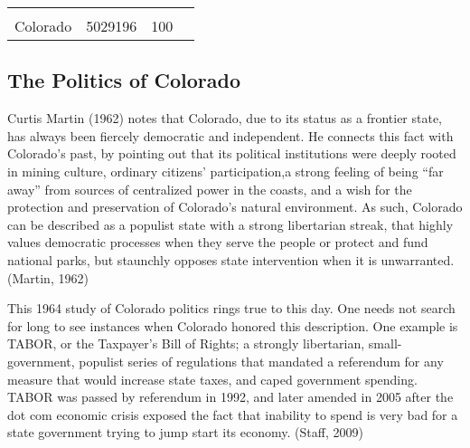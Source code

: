 \documentclass[12pt,twoside]{reedthesis}
\begin{document}
\begin{longtable}[]{@{}lccl@{}}
\begin{minipage}[t]{0.34\columnwidth}
  \strut
  \end{minipage}\tabularnewline
  \begin{minipage}[t]{0.13\columnwidth}\raggedright\strut
  Colorado\strut
  \end{minipage} & \begin{minipage}[t]{0.21\columnwidth}\centering\strut
  5029196\strut
  \end{minipage} & \begin{minipage}[t]{0.20\columnwidth}\centering\strut
  100\strut
  \end{minipage} & \begin{minipage}[t]{0.34\columnwidth}\raggedright\strut
  \strut
  \end{minipage}\tabularnewline
  \bottomrule
  \end{longtable}
  
  \clearpage
  
  \subsection{The Politics of Colorado}\label{the-politics-of-colorado}
  
  Curtis Martin (1962) notes that Colorado, due to its status as a
  frontier state, has always been fiercely democratic and independent. He
  connects this fact with Colorado's past, by pointing out that its
  political institutions were deeply rooted in mining culture, ordinary
  citizens' participation,a strong feeling of being ``far away'' from
  sources of centralized power in the coasts, and a wish for the
  protection and preservation of Colorado's natural environment. As such,
  Colorado can be described as a populist state with a strong libertarian
  streak, that highly values democratic processes when they serve the
  people or protect and fund national parks, but staunchly opposes state
  intervention when it is unwarranted. (Martin, 1962)
  
  This 1964 study of Colorado politics rings true to this day. One needs
  not search for long to see instances when Colorado honored this
  description. One example is TABOR, or the Taxpayer's Bill of Rights; a
  strongly libertarian, small-government, populist series of regulations
  that mandated a referendum for any measure that would increase state
  taxes, and caped government spending. TABOR was passed by referendum in
  1992, and later amended in 2005 after the dot com economic crisis
  exposed the fact that inability to spend is very bad for a state
  government trying to jump start its economy. (Staff, 2009)
  
\end{document}
